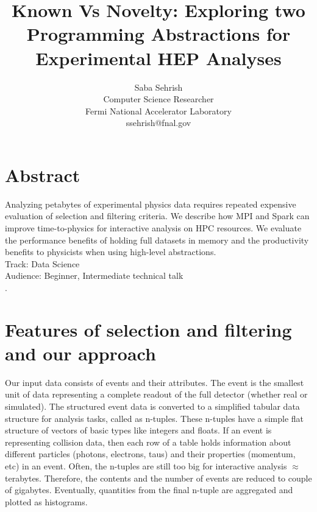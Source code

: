 \documentclass[11pt, twocolumn]{article}
\newcommand{\squeezeup}{\vspace{-5.5mm}}
\begin{document}
\title{Known Vs Novelty: Exploring two Programming Abstractions for Experimental HEP Analyses}
\author{Saba Sehrish \\ Computer Science Researcher\\ Fermi National Accelerator Laboratory \\ ssehrish@fnal.gov}
\date{}
\maketitle

\thispagestyle{empty}

\section*{Abstract}
\squeezeup
Analyzing petabytes of experimental physics data requires repeated expensive evaluation of selection and filtering criteria. We describe how MPI and Spark can improve time-to-physics for interactive analysis on HPC resources. We evaluate the performance benefits of holding full datasets in memory and the productivity benefits to physicists when using high-level abstractions. 
\\
Track: Data Science  \\
Audience: Beginner, Intermediate technical talk \\
\squeezeup
. 
\squeezeup
\section{Features of selection and filtering and our approach}


Our input data consists of events and their attributes. 
The event is the smallest unit of data representing a complete readout of the full
detector (whether real or simulated). 
The structured event data is converted to a simplified tabular data structure for analysis tasks, called as n-tuples. 
These n-tuples have a simple flat structure of vectors of basic types like integers and floats. 
If an event is representing collision data, then 
each row of a table holds information about different particles (photons, electrons, taus) and 
their properties (momentum, etc) in an event. Often, the n-tuples are still too big for interactive 
analysis $\approx$ terabytes. Therefore, the contents and the number of events are 
reduced to couple of gigabytes. Eventually, quantities from the final n-tuple are aggregated 
and plotted as histograms. 
\end{document}
